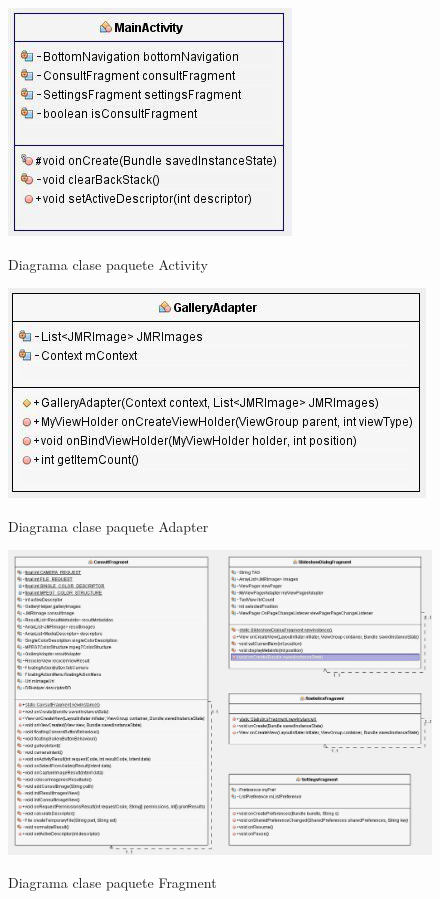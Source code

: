 \begin{figure}[H] %
\centering
\includegraphics[scale=0.6]{imagenes/diagrama1.jpg}  %
\label{diagrama1}
\caption{Diagrama clase paquete Activity}
\end{figure}

\begin{figure}[H] %
\centering
\includegraphics[scale=0.6]{imagenes/diagrama2.jpg}  %
\label{diagrama2}
\caption{Diagrama clase paquete Adapter}
\end{figure}

\begin{figure}[H] %
\centering
\includegraphics[scale=0.6]{imagenes/diagrama3.jpg}  %
\label{diagrama3}
\caption{Diagrama clase paquete Fragment}
\end{figure}

